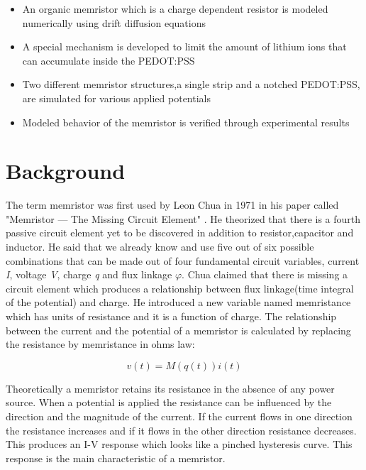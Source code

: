 \begin{doublespace}
\begin{itemize}
  \item An organic memristor which is a charge dependent resistor is modeled numerically using drift diffusion equations  
  \item A special mechanism is developed to limit the amount of lithium ions that can accumulate inside the PEDOT:PSS
  \item Two different memristor structures,a single strip and a notched PEDOT:PSS, are simulated for various applied potentials
  \item Modeled behavior of the memristor is verified through experimental results 
\end{itemize}

\section{Background}
The term memristor was first used by Leon Chua in 1971 in his paper called  "Memristor — The Missing Circuit Element" \cite{chua}. He theorized that there is a fourth passive circuit element yet to be discovered in addition to resistor,capacitor and inductor. He said that we already know and use five out of six possible combinations that can be made out of four fundamental circuit variables, current \textit{I}, voltage \textit{V}, charge \textit{q} and flux linkage \textit{$\varphi$}. Chua claimed that there is missing a circuit element which produces a relationship between flux linkage(time integral of the potential) and charge. He introduced a new variable named memristance which has units of resistance and it is a function of charge. The relationship between the current and the potential of a memristor is calculated by replacing the resistance by memristance in ohms law:


\begin{equation}
v(t)=M(q(t))i(t)
\end{equation}

Theoretically a memristor retains its resistance in the absence of any power source. When a potential is applied the resistance can be influenced by the direction and the magnitude of the current. If the current flows in one direction the resistance increases and if it flows in the other direction resistance decreases. This produces an I-V response which looks like a pinched hysteresis curve. This response is the main characteristic of a memristor. 


\end{doublespace}
